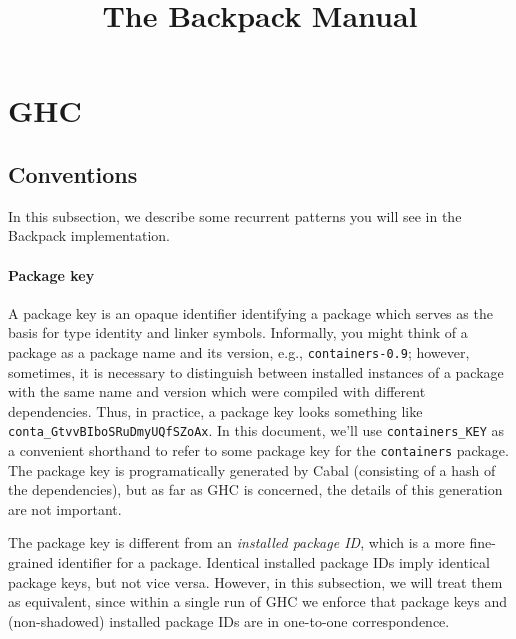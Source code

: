 \documentclass{article}
\title{The Backpack Manual}
\begin{document}
\maketitle

\section{GHC}

\subsection{Conventions}

In this subsection, we describe some recurrent patterns you will see in the
Backpack implementation.

\paragraph{Package key}  A package key is an opaque identifier
identifying a package which serves as the basis for type identity and
linker symbols.  Informally, you might think of a package as a package
name and its version, e.g., \texttt{containers-0.9}; however, sometimes,
it is necessary to distinguish between installed instances of a package
with the same name and version which were compiled with different
dependencies.  Thus, in practice, a package key looks something like
\texttt{conta\_GtvvBIboSRuDmyUQfSZoAx}.  In this document, we'll use
\texttt{containers\_KEY} as a convenient shorthand to refer to some
package key for the \texttt{containers} package.  The package key is
programatically generated by Cabal (consisting of a hash of the
dependencies), but as far as GHC is concerned, the details of this
generation are not important.

The package key is different from an \emph{installed package ID}, which
is a more fine-grained identifier for a package.  Identical installed
package IDs imply identical package keys, but not vice versa.  However,
in this subsection, we will treat them as equivalent, since within a single
run of GHC we enforce that package keys and (non-shadowed) installed
package IDs are in one-to-one correspondence.
\end{document}
